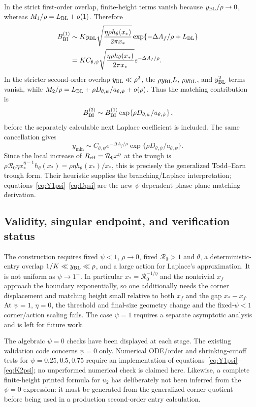 \documentclass[11pt,a4paper]{article}
\newcommand{\Rzero}{\mathcal R_0}
\begin{document}
In the strict first-order overlap, finite-height terms vanish because
$y_{\rm BL}/\rho\to0$, whereas $M_1/\rho=L_{\rm BL}+o(1)$.  Therefore
\begin{align*}
 B_{\rm BI}^{(1)}
 &\sim Ky_{\rm BL}\sqrt{\frac{\eta\rho h_\theta(x_*)}{2\pi x_*}}
 \exp\{-\Delta A_f/\rho+L_{\rm BL}\}\\
 &=KC_{\theta,\psi}
 \sqrt{\frac{\eta\rho h_\theta(x_*)}{2\pi x_*}}
 e^{-\Delta A_f/\rho}.
\end{align*}
In the stricter second-order overlap $y_{\rm BL}\ll\rho^2$, the
$\rho y_{\rm BL}L$, $\rho y_{\rm BL}$, and $y_{\rm BL}^2$ terms vanish,
while $M_2/\rho=L_{\rm BL}+\rho
D_{\theta,\psi}/a_{\theta,\psi}+o(\rho)$.  Thus the matching contribution is
\begin{equation}
 B_{\rm BI}^{(2)}\sim B_{\rm BI}^{(1)}
 \exp\!\left\{\rho D_{\theta,\psi}/a_{\theta,\psi}\right\},
 \label{eq:BIpsi2}
\end{equation}
before the separately calculable next Laplace coefficient is included.  The
same cancellation gives
\[
 y_{\min}\sim C_{\theta,\psi}e^{-\Delta A_f/\rho}
 \exp\{\rho D_{\theta,\psi}/a_{\theta,\psi}\}.
\]
Since the local increase of $R_{\rm eff}=\Rzero x^\eta$ at the trough is
$\rho\Rzero\eta x_*^{\eta-1}h_\theta(x_*)
=\rho\eta h_\theta(x_*)/x_*$, this is precisely the generalized
Todd--Earn trough form.  Their heuristic supplies the branching/Laplace
interpretation; equations~\eqref{eq:Y1psi}--\eqref{eq:Dpsi} are the new
$\psi$-dependent phase-plane matching derivation.

\subsection{Validity, singular endpoint, and verification status}
The construction requires fixed $\psi<1$, $\rho\to0$, fixed $\Rzero>1$ and
$\theta$, a deterministic-entry overlap $1/K\ll y_{\rm BL}\ll\rho$, and a
large action for Laplace's approximation.  It is not uniform as
$\psi\to1^-$.  In particular $x_*=\Rzero^{-1/\eta}$ and the nontrivial $x_f$
approach the boundary exponentially, so one additionally needs the corner
displacement and matching height small relative to both $x_f$ and the gap
$x_*-x_f$.  At $\psi=1$, $\eta=0$, the threshold and final-size geometry
change and the fixed-$\psi<1$ corner/action scaling fails.  The case $\psi=1$
requires a separate asymptotic analysis and is left for future work.

The algebraic $\psi=0$ checks have been displayed at each stage.  The existing
validation code concerns $\psi=0$ only.  Numerical ODE/order and shrinking-cutoff
tests for $\psi=0.25,0.5,0.75$ require an implementation of
equations~\eqref{eq:Y1psi}--\eqref{eq:K2psi}; no unperformed numerical check is
claimed here.  Likewise, a complete finite-height printed formula for $u_2$
has deliberately not been inferred from the $\psi=0$ expression: it must be
generated from the generalized corner quotient before being used in a
production second-order entry calculation.
\end{document}
